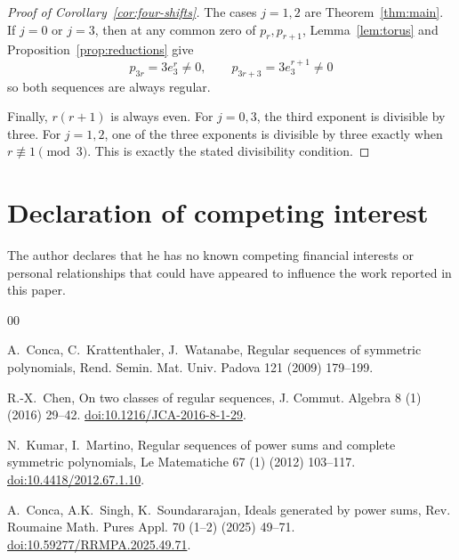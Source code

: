 \documentclass[preprint,12pt]{elsarticle}
\begin{document}
\begin{proof}[Proof of Corollary~\ref{cor:four-shifts}]
The cases $j=1,2$ are Theorem~\ref{thm:main}. If $j=0$ or $j=3$, then at any
common zero of $p_r,p_{r+1}$, Lemma~\ref{lem:torus} and
Proposition~\ref{prop:reductions} give
$$
p_{3r}=3e_3^r\neq0,\qquad p_{3r+3}=3e_3^{r+1}\neq0
$$
so both sequences are always regular.

Finally, $r(r+1)$ is always even. For $j=0,3$, the third exponent is divisible
by three. For $j=1,2$, one of the three exponents is divisible by three exactly
when $r\not\equiv1\pmod3$. This is exactly the stated divisibility condition.
\end{proof}

\section*{Declaration of competing interest}
The author declares that he has no known competing financial interests or
personal relationships that could have appeared to influence the work reported
in this paper.

\begin{thebibliography}{00}

A.~Conca, C.~Krattenthaler, J.~Watanabe,
Regular sequences of symmetric polynomials,
Rend. Semin. Mat. Univ. Padova 121 (2009) 179--199.

R.-X.~Chen,
On two classes of regular sequences,
J. Commut. Algebra 8 (1) (2016) 29--42.
\newblock \href{https://doi.org/10.1216/JCA-2016-8-1-29}{doi:10.1216/JCA-2016-8-1-29}.

N.~Kumar, I.~Martino,
Regular sequences of power sums and complete symmetric polynomials,
Le Matematiche 67 (1) (2012) 103--117.
\newblock \href{https://doi.org/10.4418/2012.67.1.10}{doi:10.4418/2012.67.1.10}.

A.~Conca, A.K.~Singh, K.~Soundararajan,
Ideals generated by power sums,
Rev. Roumaine Math. Pures Appl. 70 (1--2) (2025) 49--71.
\newblock \href{https://doi.org/10.59277/RRMPA.2025.49.71}{doi:10.59277/RRMPA.2025.49.71}.

\end{thebibliography}
\end{document}
